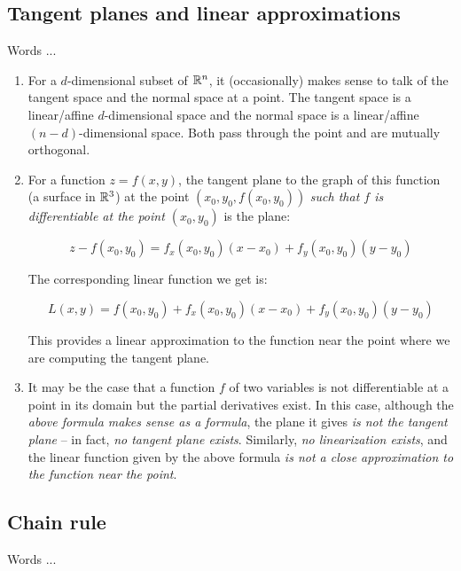 \documentclass[10pt]{amsart}
\begin{document}
\subsection{Tangent planes and linear approximations}

Words ...

\begin{enumerate}
\item For a $d$-dimensional subset of $\mathbb{R}^n$, it (occasionally) makes
  sense to talk of the tangent space and the normal space at a
  point. The tangent space is a linear/affine $d$-dimensional space
  and the normal space is a linear/affine $(n - d)$-dimensional
  space. Both pass through the point and are mutually orthogonal.
\item For a function $z = f(x,y)$, the tangent plane to the graph of
  this function (a surface in $\mathbb{R}^3$) at the point
  $(x_0,y_0,f(x_0,y_0))$ {\em such that $f$ is differentiable at the
    point $(x_0,y_0)$} is the plane:

  $$z - f(x_0,y_0) = f_x(x_0,y_0)(x - x_0) + f_y(x_0,y_0)(y - y_0)$$

  The corresponding linear function we get is:

  $$L(x,y) = f(x_0,y_0) + f_x(x_0,y_0)(x - x_0) + f_y(x_0,y_0)(y - y_0)$$

  This provides a linear approximation to the function near the point
  where we are computing the tangent plane.
\item It may be the case that a function $f$ of two variables is not
  differentiable at a point in its domain but the partial derivatives
  exist. In this case, although the {\em above formula makes sense as
    a formula}, the plane it gives {\em is not the tangent plane} --
  in fact, {\em no tangent plane exists}. Similarly, {\em no
    linearization exists}, and the linear function given by the above
  formula {\em is not a close approximation to the function near the
    point}.
\end{enumerate}

\subsection{Chain rule}

Words ...
\end{document}
